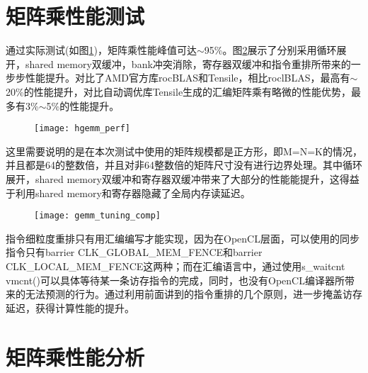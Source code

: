 \section{矩阵乘性能测试}
通过实际测试(如图\ref{fig:hgemm_perf})，矩阵乘性能峰值可达$\sim$95\%。图\ref{fig:gemm_tuning_comp}展示了分别采用循环展开，shared memory双缓冲，bank冲突消除，寄存器双缓冲和指令重排所带来的一步步性能提升。对比了AMD官方库rocBLAS和Tensile，相比roclBLAS，最高有$\sim$20\%的性能提升，对比自动调优库Tensile生成的汇编矩阵乘有略微的性能优势，最多有3\%$\sim$5\%的性能提升。
\begin{figure}[htbp]
	\centering
	\texttt{[image: hgemm\_perf]}
	\label{fig:hgemm_perf}
\end{figure}
这里需要说明的是在本次测试中使用的矩阵规模都是正方形，即M=N=K的情况，并且都是64的整数倍，并且对非64整数倍的矩阵尺寸没有进行边界处理。其中循环展开，shared memory双缓冲和寄存器双缓冲带来了大部分的性能能提升，这得益于利用shared memory和寄存器隐藏了全局内存读延迟。
\begin{figure}[htbp]
	\centering
	\texttt{[image: gemm\_tuning\_comp]}
	\label{fig:gemm_tuning_comp}
\end{figure}

指令细粒度重排只有用汇编编写才能实现，因为在OpenCL层面，可以使用的同步指令只有barrier CLK\_GLOBAL\_MEM\_FENCE和barrier CLK\_LOCAL\_MEM\_FENCE这两种；而在汇编语言中，通过使用s\_waitcnt vmcnt()可以具体等待某一条访存指令的完成，同时，也没有OpenCL编译器所带来的无法预测的行为。通过利用前面讲到的指令重排的几个原则，进一步掩盖访存延迟，获得计算性能的提升。


\section{矩阵乘性能分析}
